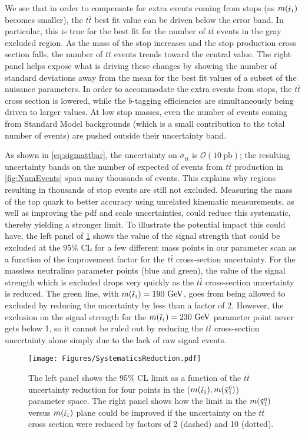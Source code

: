 \documentclass[a4paper,12pt]{article}
\newcommand{\gev}{~\text{GeV}}
\newcommand{\pb}{~\mathrm{pb}}
\def\mnino{\ensuremath{m({\footnotesize \ninoone})}}
\def\mstop{\ensuremath{m({\footnotesize \stopone})}}
\def\stopone{\ensuremath{\mathchoice%
      {\displaystyle\raise.0ex\hbox{$\displaystyle\tilde t_1$}}%
         {\textstyle\raise-.2ex\hbox{$\textstyle\tilde t_1$}}%
       {\scriptstyle\raise.0ex\hbox{$\scriptstyle\tilde t_1$}}%
 {\scriptscriptstyle\raise.0ex\hbox{$\scriptscriptstyle\tilde t_1$}}}}
\def\ninoone{\ensuremath{\mathchoice%
      {\displaystyle\raise.4ex\hbox{$\displaystyle\tilde\chi^0_1$}}%
         {\textstyle\raise.1ex\hbox{$\textstyle\tilde\chi^0_1$}}%
       {\scriptstyle\raise.3ex\hbox{$\scriptstyle\tilde\chi^0_1$}}%
 {\scriptscriptstyle\raise.3ex\hbox{$\scriptscriptstyle\tilde\chi^0_1$}}}}
\begin{document}
We see that in order to compensate for extra events coming from stops (as $\mstop$ becomes smaller), the $t\bar{t}$ best fit value can be driven below the error band. In particular, this is true for the best fit for the number of $t\bar{t}$ events in the gray excluded region. As the mass of the stop increases and the stop production cross section falls, the number of $t\bar{t}$ events trends toward the central value. The right panel helps expose what is driving these changes by showing the number of standard deviations away from the mean for the best fit values of a subset of the nuisance parameters. In order to accommodate the extra events from stops, the $t\bar{t}$ cross section is lowered, while  the $b$-tagging efficiencies are simultaneously being driven to larger values. At low stop masses, even the number of events coming from Standard Model backgrounds (which is a small contribution to the total number of events) are pushed outside their uncertainty band.

As shown in \cref{eq:sigmattbar}, the uncertainty on $\sigma_{t\bar{t}}$ is $\mathcal{O}(10\pb)$; the resulting uncertainty bands on the number of expected of events from $t\bar{t}$ production in \cref{fig:NumEvents} span many thousands of events. This explains why regions resulting in thousands of stop events are still not excluded.  Measuring the mass of the top quark to better accuracy using unrelated kinematic measurements, as well as improving the pdf and scale uncertainties, could reduce this systematic, thereby yielding a stronger limit. To illustrate the potential impact this could have, the left panel of \cref{fig:ExclusionSystematics} shows the value of the signal strength that could be excluded at the $95\%$ CL for a few different mass points in our parameter scan as a function of the improvement factor for the $t\bar{t}$ cross-section uncertainty. For the massless neutralino parameter points (blue and green), the value of the signal strength which is excluded drops very quickly as the $t\bar{t}$ cross-section uncertainty is reduced. The green line, with $\mstop = 190\gev$, goes from being allowed to excluded by reducing the uncertainty by less than a factor of 2. However, the exclusion on the signal strength for the $\mstop=230\gev$ parameter point never gets below 1, so it cannot be ruled out by reducing the $t\bar{t}$ cross-section uncertainty alone simply due to the lack of raw signal events.

\begin{figure}[t]
\begin{center}
\texttt{[image: Figures/SystematicsReduction.pdf]}
\caption{The left panel shows the 95\% CL limit as a function of the $t\bar{t}$ uncertainty reduction for four points in the ($\mstop, \mnino$) parameter space.  The right panel shows how the limit in the $\mnino$ versus $\mstop$ plane could be improved if the uncertainty on the $t\bar{t}$ cross section were reduced by factors of 2 (dashed) and 10 (dotted).}
\label{fig:ExclusionSystematics}
\end{center}
\end{figure}
\end{document}
